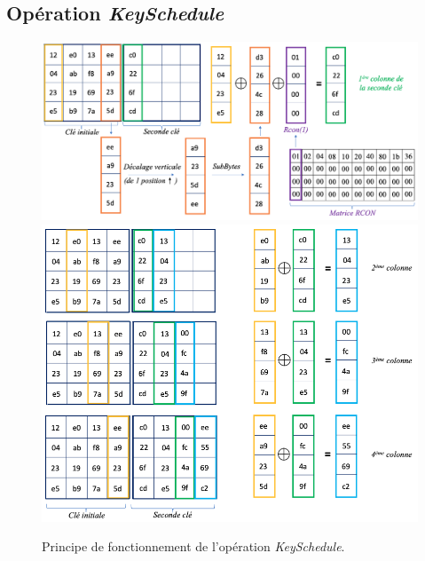 \documentclass[oneside]{book}
\begin{document}
\begin{appendices}
\newpage

\section{Opération \textit{KeySchedule}}
\label{ann:KeySchedule}
\begin{figure}[htbp]
    \centering
    \includegraphics[scale=0.35]{image/KeySchedule1}
    \includegraphics[scale=0.45]{image/KeySchedule2}
    \caption{Principe de fonctionnement de l'opération \textit{KeySchedule}.}
    \label{fig:KeySchedule1}
\end{figure}

\newpage



\end{appendices}
\end{document}
